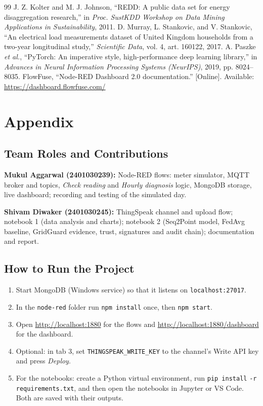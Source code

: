 \documentclass[12pt,a4paper,oneside]{report}
\begin{document}
\begin{thebibliography}{99}
 J. Z. Kolter and M. J. Johnson, ``REDD: A public data set for energy disaggregation research,'' in \emph{Proc. SustKDD Workshop on Data Mining Applications in Sustainability}, 2011.
 D. Murray, L. Stankovic, and V. Stankovic, ``An electrical load measurements dataset of United Kingdom households from a two-year longitudinal study,'' \emph{Scientific Data}, vol. 4, art. 160122, 2017.
 A. Paszke \emph{et al.}, ``PyTorch: An imperative style, high-performance deep learning library,'' in \emph{Advances in Neural Information Processing Systems (NeurIPS)}, 2019, pp. 8024--8035.
 FlowFuse, ``Node-RED Dashboard 2.0 documentation.'' [Online]. Available: \url{https://dashboard.flowfuse.com/}
\end{thebibliography}

\chapter*{Appendix}

\section*{Team Roles and Contributions}

\textbf{Mukul Aggarwal (2401030239):} Node-RED flows: meter simulator, MQTT broker and topics, \emph{Check reading} and \emph{Hourly diagnosis} logic, MongoDB storage, live dashboard; recording and testing of the simulated day.

\vspace{4pt}
\textbf{Shivam Diwaker (2401030245):} ThingSpeak channel and upload flow; notebook 1 (data analysis and charts); notebook 2 (Seq2Point model, FedAvg baseline, GridGuard evidence, trust, signatures and audit chain); documentation and report.

\section*{How to Run the Project}

\begin{enumerate}
\item Start MongoDB (Windows service) so that it listens on \texttt{localhost:27017}.
\item In the \texttt{node-red} folder run \texttt{npm install} once, then \texttt{npm start}.
\item Open \url{http://localhost:1880} for the flows and \url{http://localhost:1880/dashboard} for the dashboard.
\item Optional: in tab 3, set \texttt{THINGSPEAK\_WRITE\_KEY} to the channel's Write API key and press \emph{Deploy}.
\item For the notebooks: create a Python virtual environment, run \texttt{pip install} \texttt{-r requirements.txt}, and then open the notebooks in Jupyter or VS Code. Both are saved with their outputs.
\end{enumerate}
\end{document}
